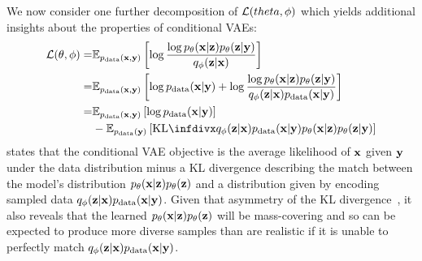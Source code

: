 We now consider one further decomposition of ${\mathcal{L}}(theta, \phi)$ which yields additional insights about the properties of conditional VAEs:
\begin{align}
    \gL(\theta, \phi) =& \EX_{\pdata(\rvx,\rvy)} \left[ \log \frac{\log p_\theta(\rvx|\rvz)p_\theta(\rvz|\rvy)}{q_\phi(\rvz|\rvx)} \right] \\
    =& \EX_{\pdata(\rvx,\rvy)} \left[ \log \pdata(\rvx|\rvy) + \log \frac{\log p_\theta(\rvx|\rvz)p_\theta(\rvz|\rvy)}{q_\phi(\rvz|\rvx)\pdata(\rvx|\rvy)} \right] \\
    \label{eq:conditional-elbo-other-formulation}
    =& \EX_{\pdata(\rvx,\rvy)} \left[ \log \pdata(\rvx|\rvy) \right] \\
    &- \EX_{\pdata(\rvy)} \left[ \kl{q_\phi(\rvz|\rvx)\pdata(\rvx|\rvy)}{p_\theta(\rvx|\rvz)p_\theta(\rvz|\rvy)} \right] \nonumber
\end{align}
 states that the conditional VAE objective is the average likelihood of ${\mathbf{x}}$ given ${\mathbf{y}}$ under the data distribution minus a KL divergence describing the match between the model's distribution $p_\theta({\mathbf{x}}|{\mathbf{z}})p_\theta({\mathbf{z}})$ and a distribution given by encoding sampled data $q_\phi({\mathbf{z}}|{\mathbf{x}})p_{\rm{data}}({\mathbf{x}}|{\mathbf{y}})$. Given that asymmetry of the KL divergence~\citep{bishop2006pattern}, it also reveals that the learned $p_\theta({\mathbf{x}}|{\mathbf{z}})p_\theta({\mathbf{z}})$ will be mass-covering and so can be expected to produce more diverse samples than are realistic if it is unable to perfectly match $q_\phi({\mathbf{z}}|{\mathbf{x}})p_{\rm{data}}({\mathbf{x}}|{\mathbf{y}})$.


